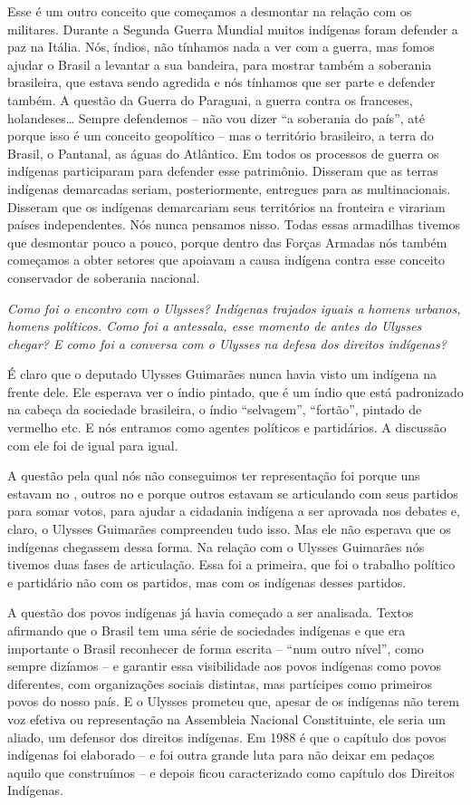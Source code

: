 Esse é um outro conceito que começamos a desmontar na relação com os
militares. Durante a Segunda Guerra Mundial muitos indígenas foram
defender a paz na Itália. Nós, índios, não tínhamos nada a ver com a
guerra, mas fomos ajudar o Brasil a levantar a sua bandeira, para
mostrar também a soberania brasileira, que estava sendo agredida e nós
tínhamos que ser parte e defender também. A questão da Guerra do
Paraguai, a guerra contra os franceses, holandeses\ldots{} Sempre defendemos
-- não vou dizer ``a soberania do país'', até porque isso é um conceito
geopolítico -- mas o território brasileiro, a terra do Brasil, o
Pantanal, as águas do Atlântico. Em todos os processos de guerra os
indígenas participaram para defender esse patrimônio. Disseram que as
terras indígenas demarcadas seriam, posteriormente, entregues para as
multinacionais. Disseram que os indígenas demarcariam seus territórios
na fronteira e virariam países independentes. Nós nunca pensamos nisso.
Todas essas armadilhas tivemos que desmontar pouco a pouco, porque
dentro das Forças Armadas nós também começamos a obter setores que
apoiavam a causa indígena contra esse conceito conservador de soberania
nacional.

\medskip

\noindent\emph{Como foi o encontro com o Ulysses? Indígenas trajados iguais a
homens urbanos, homens políticos. Como foi a antessala, esse momento de
antes do Ulysses chegar? E como foi a conversa com o Ulysses na defesa
dos direitos indígenas?}

É claro que o deputado Ulysses Guimarães nunca havia
visto um indígena na frente dele. Ele esperava ver o índio pintado, que
é um índio que está padronizado na cabeça da sociedade brasileira, o
índio ``selvagem'', ``fortão'', pintado de vermelho etc. E nós entramos
como agentes políticos e partidários. A discussão com ele foi de igual
para igual.

A questão pela qual nós não conseguimos ter representação foi porque uns
estavam no , outros no  e porque outros estavam se articulando
com seus partidos para somar votos, para ajudar a cidadania indígena a
ser aprovada nos debates e, claro, o Ulysses Guimarães compreendeu tudo
isso. Mas ele não esperava que os indígenas chegassem dessa forma. Na
relação com o Ulysses Guimarães nós tivemos duas fases de articulação.
Essa foi a primeira, que foi o trabalho político e partidário não com os
partidos, mas com os indígenas desses partidos.

A questão dos povos indígenas já havia começado a ser analisada. Textos
afirmando que o Brasil tem uma série de sociedades indígenas e que era
importante o Brasil reconhecer de forma escrita -- ``num outro nível'',
como sempre dizíamos -- e garantir essa visibilidade aos povos indígenas
como povos diferentes, com organizações sociais distintas, mas
partícipes como primeiros povos do nosso país. E o Ulysses prometeu que,
apesar de os indígenas não terem voz efetiva ou representação na
Assembleia Nacional Constituinte, ele seria um aliado, um defensor dos
direitos indígenas. Em 1988 é que o capítulo dos povos indígenas foi
elaborado -- e foi outra grande luta para não deixar em pedaços aquilo
que construímos -- e depois ficou caracterizado como capítulo dos
Direitos Indígenas.

